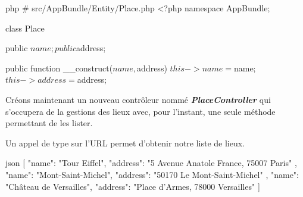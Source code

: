 \documentclass[big]{zmdocument}
\begin{document}
\begin{CodeBlock}{php}
# src/AppBundle/Entity/Place.php
<?php
namespace AppBundle\Entity;

class Place
{
    public $name;

    public $address;

    public function __construct($name, $address)
    {
        $this->name = $name;
        $this->address = $address;
    }
}
\end{CodeBlock}



Créons maintenant un nouveau contrôleur nommé \textbf{\textit{PlaceController}} qui s'occupera de la gestions des lieux avec, pour l'instant, une seule méthode permettant de les lister.






Un appel de type  sur l'URL  permet d'obtenir notre liste de lieux.



\begin{CodeBlock}{json}
[
  {
    "name": "Tour Eiffel",
    "address": "5 Avenue Anatole France, 75007 Paris"
  },
  {
    "name": "Mont-Saint-Michel",
    "address": "50170 Le Mont-Saint-Michel"
  },
  {
    "name": "Château de Versailles",
    "address": "Place d'Armes, 78000 Versailles"
  }
]
\end{CodeBlock}
\end{document}
